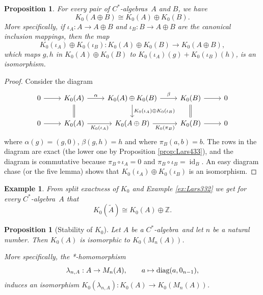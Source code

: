 \documentclass{book}
\newtheorem{example}[definition]{Example}
\newtheorem{proposition}[definition]{Proposition}
\def\cstar{\(C^*\)-algebra}
\def\cstars{\(C^*\)-algebras}
\def\diag{\textnormal{diag}}
\begin{document}
\begin{proposition}
  For every pair of \cstars\ \(A\) and \(B\), we have
  \[
    K_0(A\oplus B)\cong K_0(A)\oplus K_0(B).
  \]
  More specifically, if \(\iota_A:A\to A\oplus B\) and \(\iota_B:B\to A\oplus B\) are the canonical
  inclusion mappings, then the map
  \[
    K_0(\iota_A)\oplus K_0(\iota_B):K_0(A)\oplus K_0(B)\to K_0(A\oplus B),
  \]
  which maps \(g,h\) in \(K_0(A)\oplus K_0(B)\) to \(K_0(\iota_A)(g)+K_0(\iota_B)(h)\), is an isomorphism.
\end{proposition}
\begin{proof}
  Consider the diagram
  \[
    \begin{tikzcd}
      0\arrow[r]&K_0(A)\arrow[r,"\alpha"]\arrow[d,equal]&K_0(A)\oplus K_0(B)\arrow[r,"\beta"]\arrow[d,"K_0(\iota_A)\oplus K_0(\iota_B)"]&K_0(B)\arrow[r]\arrow[d,equal]&0\\
      0\arrow[r]&K_0(A)\arrow[r,"K_0(\iota_A)",swap]&K_0(A\oplus B)\arrow[r,"K_0(\pi_B)",swap]&K_0(B)\arrow[r]&0
    \end{tikzcd}
  \]
  where \(\alpha(g)=(g,0)\), \(\beta(g,h)=h\) and where \(\pi_B(a,b)=b\). The rows in the diagram are exact
  (the lower one by Proposition \ref{prop:Lars433}), and the diagram is commutative because \(\pi_B\circ\iota_A=0\)
  and \(\pi_B\circ\iota_B=\operatorname{id}_B\). An easy diagram chase (or the five lemma) shows that \(K_0(\iota_A)\oplus K_0(\iota_B)\)
  is an isomorphism.
\end{proof}
\begin{example}
  From split exactness of \(K_0\) and Example \ref{ex:Lars332} we get for every \cstar\ \(A\) that
  \[
    K_0(\tilde{A})\cong K_0(A)\oplus \mathbb{Z}.
  \]
\end{example}
\begin{proposition}[Stability of \(K_0\)]
  Let \(A\) be a \cstar\ and let \(n\) be a natural number. Then \(K_0(A)\) is isomorphic to \(K_0(M_n(A))\).\par
  More specifically, the *-homomorphism
  \[
    \lambda_{n,A}:A\to M_n(A),\qquad a\mapsto\diag(a,0_{n-1}),
  \]
  induces an isomorphism \(K_0(\lambda_{n,A}):K_0(A)\to K_0(M_n(A))\).
\end{proposition}
\end{document}
